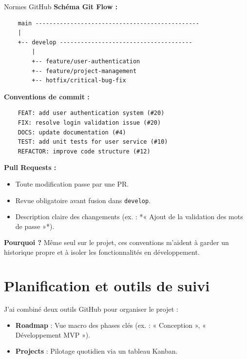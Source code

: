 \begin{for_you}{Normes GitHub}
    \textbf{Schéma Git Flow :}
    \begin{verbatim}
    main -----------------------------------------------
    |
    +-- develop --------------------------------------
        |
        +-- feature/user-authentication
        +-- feature/project-management
        +-- hotfix/critical-bug-fix
    \end{verbatim}

    \textbf{Conventions de commit :}
    \begin{lstlisting}
    FEAT: add user authentication system (#20)
    FIX: resolve login validation issue (#20)
    DOCS: update documentation (#4)
    TEST: add unit tests for user service (#10)
    REFACTOR: improve code structure (#12)
    \end{lstlisting}

    \textbf{Pull Requests :}
    \begin{itemize}
        \item Toute modification passe par une PR.
        \item Revue obligatoire avant fusion dans \texttt{develop}.
        \item Description claire des changements (ex. : *« Ajout de la validation des mots de passe »*).
        \newline
    \end{itemize}

    \textbf{Pourquoi ? \newline}
    Même seul sur le projet, ces conventions m’aident à garder un historique propre et à isoler les fonctionnalités en développement.
\end{for_you}

\section{Planification et outils de suivi}
J’ai combiné deux outils GitHub pour organiser le projet :
\begin{itemize}
    \item \textbf{Roadmap} : Vue macro des phases clés (ex. : « Conception », « Développement MVP »).
    \item \textbf{Projects} : Pilotage quotidien via un tableau Kanban.
    \newline
\end{itemize}


